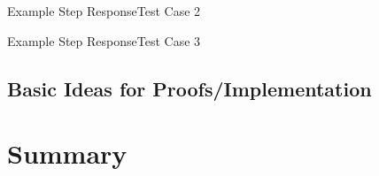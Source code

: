 \documentclass{beamer}
\begin{document}
\begin{frame}{Example Step Response}{Test Case 2}
\begin{center}
    
\end{center}
\end{frame}

\begin{frame}{Example Step Response}{Test Case 3}
\begin{center}
    
\end{center}
\end{frame}

\subsection{Basic Ideas for Proofs/Implementation}


\section{Summary}
\end{document}
